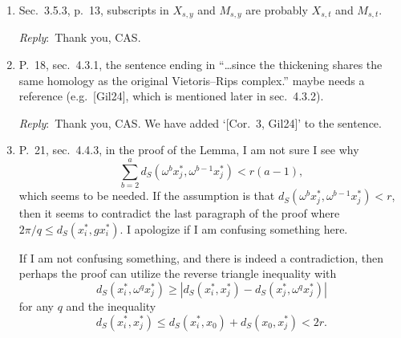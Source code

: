\documentclass{amsart}
\newcommand{\ar}{\medskip\noindent\textit{Reply}:\ }
\begin{document}
\begin{enumerate}
		\ar
		We need to show that for any \(k \in \Fp\) the operation \(\phi\) satisfies \(\phi(k x) = k \phi(x)\) knowing that \(\phi(x+y) = \phi(x) + \phi(y)\).
		Since scalar multiplication in $\mathbb{F}_p$ is given by repeated addition (\(k x = \sum_{k} x\)), additivity implies $\mathbb{F}_p$-linearity.\\
		We have expanded the mentioned sentence to add the above explanation:\\
		\\
		``For any prime $p$, since scalar multiplication in $\mathbb{F}_p$ is given by repeated addition, additivity implies $\mathbb{F}_p$-linearity.
		Hence all cohomology operations in $\cA_p$ are linear.''

		\item Sec.~3.5.3, p.~13, subscripts in $X_{s,y}$ and $M_{s,y}$ are probably $X_{s,t}$ and $M_{s,t}$.

		\ar Thank you, CAS.

		\item P.~18, sec.~4.3.1, the sentence ending in ``\dots since the thickening shares the same homology as the original Vietoris--Rips complex.'' maybe needs a reference (e.g.~[Gil24], which is mentioned later in sec.~4.3.2).

		\ar Thank you, CAS. We have added `[Cor.~3, Gil24]' to the sentence.

		\item P.~21, sec.~4.4.3, in the proof of the Lemma, I am not sure I see why
		\[
		\sum_{b=2}^{a} d_S(\omega^b x_j^*, \omega^{b-1} x_j^*) < r(a-1),
		\]
		which seems to be needed. If the assumption is that $d_S(\omega^b x_j^*, \omega^{b-1} x_j^*) < r$, then it seems to contradict the last paragraph of the proof where $2\pi/q \le d_S(x_i^*, g x_i^*)$.
		I apologize if I am confusing something here.

		If I am not confusing something, and there is indeed a contradiction, then perhaps the proof can utilize the reverse triangle inequality with
		\[
		d_S(x_i^*, \omega^q x_j^*) \ge
		\left| d_S(x_i^*, x_j^*) - d_S(x_j^*, \omega^q x_j^*) \right|
		\]
		for any $q$ and the inequality
		\[
		d_S(x_i^*, x_j^*) \le d_S(x_i^*, x_0) + d_S(x_0, x_j^*) < 2r.
		\]


\end{enumerate}
\end{document}
